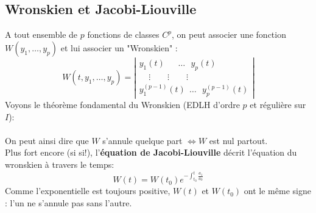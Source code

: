 \documentclass[11pt, a4paper, openany]{book}
\begin{document}
\subsection{Wronskien et Jacobi-Liouville}
A tout ensemble de $p$ fonctions de classes $C^p$, on peut associer une fonction $W(y_1, \dots, y_p)$ et lui associer un "Wronskien" :
\begin{equation}
	W(t, y_1,\dots,y_p) = \left|\begin{array}{l}
	y_1(t)\ \ \   \ \ \  \  \dots  \  \ \  y_p(t)\\
	\ \ \ \ \ \vdots\ \ \ \ \ \ \ \ \ \vdots\ \ \ \ \ \ \ \ \ \vdots\\
	y_1^{(p-1)}(t)\ \ \dots\ \ \ y_p^{(p-1)}(t)
	\end{array}\right|
\end{equation}
Voyons le théorème fondamental du Wronskien (EDLH d'ordre $p$ et régulière sur $I$): \\
\ \\
		
On peut ainsi dire que $W$ s'annule quelque part $\Leftrightarrow W$ est nul partout.\\
		
Plus fort encore (si si!), l'\textbf{équation de Jacobi-Liouville} décrit l'équation du wronskien à travers le temps:
\begin{equation}
	W(t) = W(t_0)e^{-\int_{t_0}^t \frac{a_1}{a_0}}
\end{equation}
Comme l'exponentielle est toujours positive, $W(t)$ et $W(t_0)$ ont le même signe : l'un ne s'annule pas sans l'autre.
		
\end{document}
